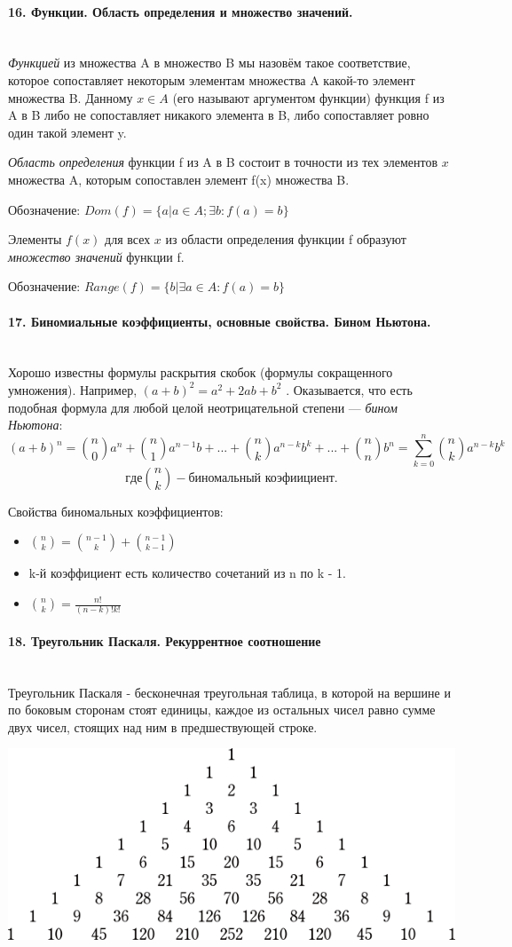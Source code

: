 \documentclass[a4paper, 12pt]{article}
\newcommand{\parag}[1]{\paragraph{#1}\mbox{}\\}
\begin{document}
\parag{16. Функции. Область определения и множество значений.}
\textit{Функцией} из множества A в множество B мы назовём такое соответствие, которое сопоставляет некоторым элементам множества A какой-то элемент множества
B. Данному $x \in A$ (его называют аргументом функции) функция f из A в B либо
не сопоставляет никакого элемента в B, либо сопоставляет ровно один такой элемент y.

\noindent
\textit{Область определения} функции f из A в B состоит в точности из тех элементов $x$ множества A, которым сопоставлен элемент f(x) множества B.

Обозначение: $Dom(f) = \{a | a \in A; \exists b: f(a) = b\}$

\noindent
Элементы $f(x)$ для всех $x$ из области определения функции f образуют \textit{множество значений} функции f.

Обозначение: $Range(f) = \{b | \exists a \in A: f(a) = b\}$

\parag{17. Биномиальные коэффициенты, основные свойства. Бином Ньютона.}
Хорошо известны формулы раскрытия скобок (формулы сокращенного умножения). Например, $(a + b)^{2} = a^2 + 2ab + b^2$ . Оказывается, что есть подобная формула для любой целой неотрицательной степени — \textit{бином Ньютона}:
\[
    (a+b)^{n} = {n \choose 0}a^n + {n \choose 1}a^{n-1}b + ... + {n \choose k}a^{n-k}b^k + ... + {n \choose n}b^n = \overset{n}{\underset{k=0}{\sum}}{n \choose k}a^{n-k}b^k
\]
$$ где {n \choose k} - \textit{биномальный коэфиициент.}$$

\noindent
Свойства биномальных коэффициентов:
\begin{itemize}
    \item ${n \choose k} = {n - 1 \choose k} + {n - 1 \choose k - 1}$
    \item k-й коэффициент есть количество сочетаний из n по k - 1.
    \item ${n \choose k} = \frac{n!}{(n-k)!k!}$
\end{itemize}

\parag{18. Треугольник Паскаля. Рекуррентное соотношение}
Треугольник Паскаля - бесконечная треугольная таблица, в которой на вершине и по боковым сторонам стоят единицы, каждое из остальных чисел равно сумме двух чисел, стоящих над ним в предшествующей строке.

\vspace{30px}
\includegraphics[width=\textwidth]{images/pascal_traingle.png}
\vspace{30px}
\end{document}
